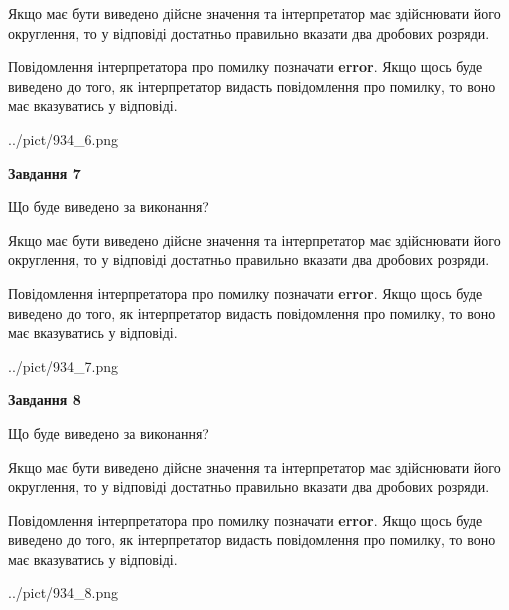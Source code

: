 \documentclass[12pt, ukrainian]{article}
\begin{document}
{\begin {Large}
Якщо має бути виведено дійсне значення та інтерпретатор має здійснювати його округлення, 
то у відповіді достатньо правильно вказати два дробових розряди.

Повідомлення інтерпретатора про помилку позначати \textbf{error}.
Якщо щось буде виведено до того, як інтерпретатор видасть повідомлення про помилку, 
то воно має вказуватись у відповіді. \par

\begin{center}
	{../pict/934_6.png}
\end{center}
\newpage

{\begin {center}\textbf{Завдання 7}\end {center}}\par
Що буде виведено за виконання? \par

Якщо має бути виведено дійсне значення та інтерпретатор має здійснювати його округлення, 
то у відповіді достатньо правильно вказати два дробових розряди.

Повідомлення інтерпретатора про помилку позначати \textbf{error}.
Якщо щось буде виведено до того, як інтерпретатор видасть повідомлення про помилку, 
то воно має вказуватись у відповіді. \par

\begin{center}
	{../pict/934_7.png}
\end{center}
\newpage

{\begin {center}\textbf{Завдання 8}\end {center}}\par
Що буде виведено за виконання? \par

Якщо має бути виведено дійсне значення та інтерпретатор має здійснювати його округлення, 
то у відповіді достатньо правильно вказати два дробових розряди.

Повідомлення інтерпретатора про помилку позначати \textbf{error}.
Якщо щось буде виведено до того, як інтерпретатор видасть повідомлення про помилку, 
то воно має вказуватись у відповіді. \par

\begin{center}
	{../pict/934_8.png}
\end{center}
\newpage


\end{Large}}
\end{document}
